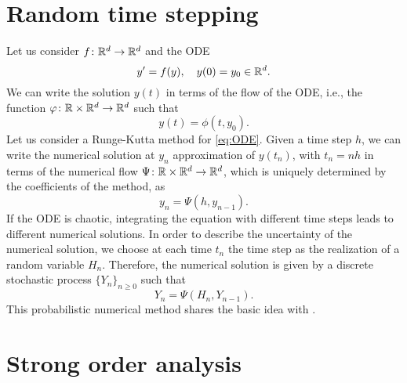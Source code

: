 \documentclass{scrartcl}
\begin{document}
	
\section*{Random time stepping}

Let us consider $f\colon\mathbb{R}^d\to\mathbb{R}^d$ and the ODE 
\begin{equation}\label{eq:ODE}
	y' = f(y), \quad y(0) = y_0 \in \mathbb{R}^d.
\end{equation}
We can write the solution $y(t)$ in terms of the flow of the ODE, i.e., the function $\varphi\colon\mathbb{R}\times\mathbb{R}^d\to\mathbb{R}^d$ such that 
\begin{equation}
	y(t) = \phi(t, y_0).
\end{equation}
Let us consider a Runge-Kutta method for \eqref{eq:ODE}. Given a time step $h$, we can write the numerical solution at $y_n$ approximation of $y(t_n)$, with $t_n = nh$ in terms of the numerical flow $\Psi\colon\mathbb{R}\times\mathbb{R}^d\to\mathbb{R}^d$, which is uniquely determined by the coefficients of the method, as
\begin{equation}
	y_n = \Psi(h, y_{n-1}).
\end{equation}
If the ODE is chaotic, integrating the equation with different time steps leads to different numerical solutions. In order to describe the uncertainty of the numerical solution, we choose at each time $t_n$ the time step as the realization of a random variable $H_n$. Therefore, the numerical solution is given by a discrete stochastic process $\{Y_n\}_{n\geq 0}$ such that
\begin{equation}\label{eq:numHSto}
	Y_n = \Psi(H_n, Y_{n-1}).
\end{equation}
This probabilistic numerical method shares the basic idea with \cite{CGS16}. 

\section{Strong order analysis}
\end{document}
